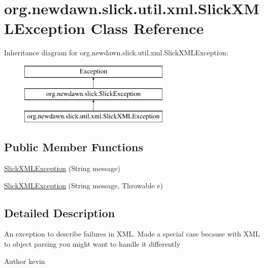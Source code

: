 \hypertarget{classorg_1_1newdawn_1_1slick_1_1util_1_1xml_1_1_slick_x_m_l_exception}{}\section{org.\+newdawn.\+slick.\+util.\+xml.\+Slick\+X\+M\+L\+Exception Class Reference}
\label{classorg_1_1newdawn_1_1slick_1_1util_1_1xml_1_1_slick_x_m_l_exception}
Inheritance diagram for org.\+newdawn.\+slick.\+util.\+xml.\+Slick\+X\+M\+L\+Exception\+:\begin{figure}[H]
\begin{center}
\leavevmode
\includegraphics[height=3.000000cm]{classorg_1_1newdawn_1_1slick_1_1util_1_1xml_1_1_slick_x_m_l_exception}
\end{center}
\end{figure}
\subsection*{Public Member Functions}
\begin{DoxyCompactItemize}
\item 
\mbox{\hyperlink{classorg_1_1newdawn_1_1slick_1_1util_1_1xml_1_1_slick_x_m_l_exception_a93f0c85d9af4cd046362723d699a767b}{Slick\+X\+M\+L\+Exception}} (String message)
\item 
\mbox{\hyperlink{classorg_1_1newdawn_1_1slick_1_1util_1_1xml_1_1_slick_x_m_l_exception_a5f09e980539440e9cd943915340a3ade}{Slick\+X\+M\+L\+Exception}} (String message, Throwable e)
\end{DoxyCompactItemize}


\subsection{Detailed Description}
An exception to describe failures in X\+ML. Made a special case because with X\+ML to object parsing you might want to handle it differently

\begin{DoxyAuthor}{Author}
kevin 
\end{DoxyAuthor}


